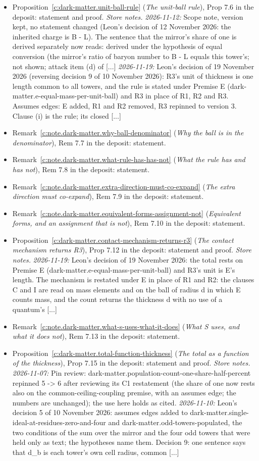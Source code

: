 \documentclass[11pt]{article}
\theoremstyle{definition}
\theoremstyle{plain}
\begin{document}
\begin{itemize}
\item Proposition~\ref{c:dark-matter.unit-ball-rule} (\emph{The unit-ball rule}), Prop 7.6 in the deposit: statement and proof. \emph{Store notes.} \emph{2026-11-12:} Scope note, version kept, no statement changed (Leon's decision of 12 November 2026: the inherited charge is B - L). The sentence that the mirror's share of one is derived separately now reads: derived under the hypothesis of equal conversion (the mirror's ratio of baryon number to B - L equals this tower's; not shown; attack item (d) of [...] \emph{2026-11-19:} Leon's decision of 19 November 2026 (reversing decision 9 of 10 November 2026): R3's unit of thickness is one length common to all towers, and the rule is stated under Premise E (dark-matter.e-equal-mass-per-unit-ball) and R3 in place of R1, R2 and R3. Assumes edges: E added, R1 and R2 removed, R3 repinned to version 3. Clause (i) is the rule; its closed [...]
\item Remark~\ref{c:note.dark-matter.why-ball-denominator} (\emph{Why the ball is in the denominator}), Rem 7.7 in the deposit: statement.
\item Remark~\ref{c:note.dark-matter.what-rule-has-has-not} (\emph{What the rule has and has not}), Rem 7.8 in the deposit: statement.
\item Remark~\ref{c:note.dark-matter.extra-direction-must-co-expand} (\emph{The extra direction must co-expand}), Rem 7.9 in the deposit: statement.
\item Remark~\ref{c:note.dark-matter.equivalent-forms-assignment-not} (\emph{Equivalent forms, and an assignment that is not}), Rem 7.10 in the deposit: statement.
\item Proposition~\ref{c:dark-matter.contact-mechanism-returns-r3} (\emph{The contact mechanism returns R3}), Prop 7.12 in the deposit: statement and proof. \emph{Store notes.} \emph{2026-11-19:} Leon's decision of 19 November 2026: the total rests on Premise E (dark-matter.e-equal-mass-per-unit-ball) and R3's unit is E's length. The mechanism is restated under E in place of R1 and R2: the clauses C and I are read on mass elements and on the ball of radius d in which E counts mass, and the count returns the thickness d with no use of a quantum's [...]
\item Remark~\ref{c:note.dark-matter.what-s-uses-what-it-does} (\emph{What S uses, and what it does not}), Rem 7.13 in the deposit: statement.
\item Proposition~\ref{c:dark-matter.total-function-thickness} (\emph{The total as a function of the thickness}), Prop 7.15 in the deposit: statement and proof. \emph{Store notes.} \emph{2026-11-07:} Pin review: dark-matter.population-count-one-share-half-percent repinned 5 -> 6 after reviewing its C1 restatement (the share of one now rests also on the common-ceiling-coupling premise, with an assumes edge; the numbers are unchanged); the use here holds as cited. \emph{2026-11-10:} Leon's decision 5 of 10 November 2026: assumes edges added to dark-matter.single-ideal-at-residues-zero-and-four and dark-matter.odd-towers-populated, the two conditions of the sum over the mirror and the four odd towers that were held only as text; the hypotheses name them. Decision 9: one sentence says that d\_b is each tower's own cell radius, common [...]

\end{itemize}
\end{document}
